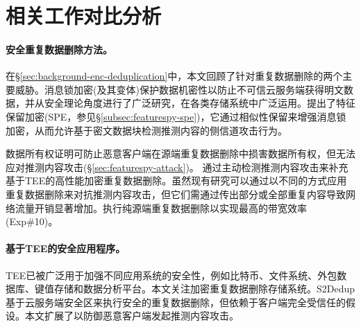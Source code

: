 \section{相关工作对比分析}
\label{sec:featurespy-related-work}

\paragraph*{安全重复数据删除方法。}
在\S\ref{sec:background-enc-deduplication}中，本文回顾了针对重复数据删除的两个主要威胁。消息锁加密(及其变体)保护数据机密性以防止不可信云服务端获得明文数据，并从安全理论角度进行了广泛研究，在各类存储系统中广泛运用。\sysnameF 提出了特征保留加密(SPE，参见\S\ref{subsec:featurespy-spe})，它通过相似性保留来增强消息锁加密，从而允许基于密文数据块检测推测内容的侧信道攻击行为。

数据所有权证明可防止恶意客户端在源端重复数据删除中损害数据所有权，但无法应对推测内容攻击(\S\ref{sec:featurespy-attack})。 \sysnameF 通过主动检测推测内容攻击来补充基于TEE的高性能加密重复数据删除\sysnameS。虽然现有研究可以通过以不同的方式应用重复数据删除来对抗推测内容攻击，但它们需通过传出部分或全部重复内容导致网络流量开销显著增加。\sysnameF 执行纯源端重复数据删除以实现最高的带宽效率(Exp\#10)。

\paragraph*{基于TEE的安全应用程序。}
TEE已被广泛用于加强不同应用系统的安全性，例如比特币、文件系统、外包数据库、键值存储和数据分析平台。本文关注加密重复数据删除存储系统。S2Dedup基于云服务端安全区来执行安全的重复数据删除，但依赖于客户端完全受信任的假设。本文扩展了\sysnameS 以防御恶意客户端发起推测内容攻击。